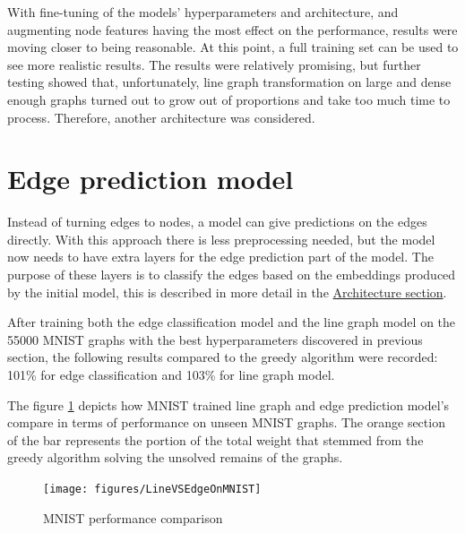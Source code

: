 With fine-tuning of the models' hyperparameters and architecture, and augmenting node features having the most effect on the performance, results were moving closer to being reasonable. At this point, a full training set can be used to see more realistic results. The results were relatively promising, but further testing showed that, unfortunately, line graph transformation on large and dense enough graphs turned out to grow out of proportions and take too much time to process. Therefore, another architecture was considered.

\section{Edge prediction model}

Instead of turning edges to nodes, a model can give predictions on the edges directly. With this approach there is less preprocessing needed, but the model now needs to have extra layers for the edge prediction part of the model. The purpose of these layers is to classify the edges based on the embeddings produced by the initial model, this is described in more detail in the \hyperref[sec:architecture]{Architecture section}.

After training both the edge classification model and the line graph model on the 55000 MNIST graphs with the best hyperparameters discovered in previous section, the following results compared to the greedy algorithm were recorded: 101\% for edge classification and 103\% for line graph model.

The figure \ref{Model performance on MNIST} depicts how MNIST trained line graph and edge prediction model's compare in terms of performance on unseen MNIST graphs. The orange section of the bar represents the portion of the total weight that stemmed from the greedy algorithm solving the unsolved remains of the graphs.
\begin{figure}[H]
    \centering
    \hspace*{-2cm}
    \texttt{[image: figures/LineVSEdgeOnMNIST]}
    \caption{MNIST performance comparison}
    \label{Model performance on MNIST}
\end{figure}


